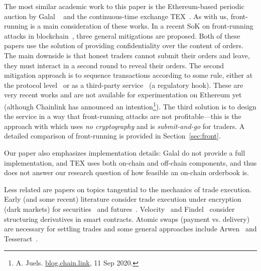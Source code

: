 The most similar academic work to this paper is the Ethereum-based periodic auction by Galal \etal~\cite{galalpublicly} and the continuous-time exchange TEX~\cite{khalil2019tex}. As with us, front-running is a main consideration of these works. In a recent SoK on front-running attacks in blockchain~\cite{eskandari2019sok}, three general mitigations are proposed. Both of these papers use the solution of providing confidentiality over the content of orders. The main downside is that honest traders cannot submit their orders and leave, they must interact in a second round to reveal their orders. The second mitigation approach is to sequence transactions according to some rule, either at the protocol level~\cite{MZGA20} or as a third-party service~\cite{Kla20} (a regulatory hook). These are very recent works and are not available for experimentation on Ethereum yet (although Chainlink has announced an intention\footnote{A. Juels. \href{https://blog.chain.link/chainlink-fair-sequencing-services-enabling-a-provably-fair-defi-ecosystem/}{blog.chain.link}, 11 Sep 2020.}). The third solution is to design the service in a way that front-running attacks are not profitable---this is the approach with \cm which uses \textit{no cryptography} and is \textit{submit-and-go} for traders. A detailed comparison of front-running is provided in Section~\ref{sec:front}.

Our paper also emphasizes implementation details: Galal \etal do not provide a full implementation, and TEX uses both on-chain and off-chain components, and thus does not answer our research question of how feasible an on-chain orderbook is. 

Less related are papers on topics tangential to the mechanics of trade execution. Early (and some recent) literature consider trade execution under encryption (\ie dark markets) for securities~\cite{TP07,YSLT10,TW12,cartlidge2019mpc} and futures~\cite{massacci2018futuresmex}. Velocity~\cite{eskandari2017feasibility} and Findel~\cite{biryukov2017findel} consider structuring derivatives in smart contracts. Atomic swaps (\ie payment vs. delivery) are necessary for settling trades and some general approaches include Arwen~\cite{heilman2020arwen} and Tesseract~\cite{bentov2017tesseract}.



